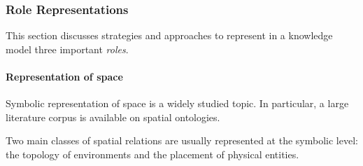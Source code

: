 \documentclass[a4paper, twocolumn]{article}
\begin{document}
\begin{scriptsize}
\begin{center}
\end{center}
\end{scriptsize}

\subsubsection{Role Representations}

This section discusses strategies and approaches to represent in a knowledge
model three important \emph{roles}.

\begin{scriptsize}
\begin{center}
\end{center}
\end{scriptsize}


\paragraph{Representation of space}

Symbolic representation of space is a widely studied topic. In particular, a
large literature corpus is available on spatial ontologies.

Two main classes of spatial relations are usually represented at the symbolic
level: the topology of environments and the placement of physical entities.

\begin{scriptsize}
\begin{center}
\end{center}
\end{scriptsize}
\end{document}
